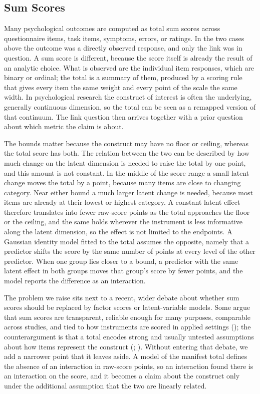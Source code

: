 \documentclass[
  man,
  floatsintext,
  longtable,
  nolmodern,
  notxfonts,
  notimes,
  colorlinks=true,linkcolor=blue,citecolor=blue,urlcolor=blue]{apa7}
\begin{document}
\subsection{Sum Scores}\label{sum-scores}

Many psychological outcomes are computed as total sum scores across
questionnaire items, task items, symptoms, errors, or ratings. In the
two cases above the outcome was a directly observed response, and only
the link was in question. A sum score is different, because the score
itself is already the result of an analytic choice. What is observed are
the individual item responses, which are binary or ordinal; the total is
a summary of them, produced by a scoring rule that gives every item the
same weight and every point of the scale the same width. In
psychological research the construct of interest is often the
underlying, generally continuous dimension, so the total can be seen as
a remapped version of that continuum. The link question then arrives
together with a prior question about which metric the claim is about.

The bounds matter because the construct may have no floor or ceiling,
whereas the total score has both. The relation between the two can be
described by how much change on the latent dimension is needed to raise
the total by one point, and this amount is not constant. In the middle
of the score range a small latent change moves the total by a point,
because many items are close to changing category. Near either bound a
much larger latent change is needed, because most items are already at
their lowest or highest category. A constant latent effect therefore
translates into fewer raw-score points as the total approaches the floor
or the ceiling, and the same holds wherever the instrument is less
informative along the latent dimension, so the effect is not limited to
the endpoints. A Gaussian identity model fitted to the total assumes the
opposite, namely that a predictor shifts the score by the same number of
points at every level of the other predictor. When one group lies closer
to a bound, a predictor with the same latent effect in both groups moves
that group's score by fewer points, and the model reports the difference
as an interaction.

The problem we raise sits next to a recent, wider debate about whether
sum scores should be replaced by factor scores or latent-variable
models. Some argue that sum scores are transparent, reliable enough for
many purposes, comparable across studies, and tied to how instruments
are scored in applied settings (); the counterargument is that a total encodes strong and
usually untested assumptions about how items represent the construct
(;
). Without entering
that debate, we add a narrower point that it leaves aside. A model of
the manifest total defines the absence of an interaction in raw-score
points, so an interaction found there is an interaction on the score,
and it becomes a claim about the construct only under the additional
assumption that the two are linearly related.
\end{document}
